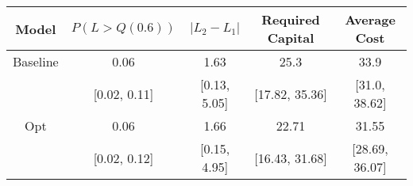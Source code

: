 \begin{tabular}{ccccc}
\toprule
   Model & $P(L > Q(0.6))$ & $|L_2 - L_1|$ & Required Capital &   Average Cost \\
\midrule
Baseline &            0.06 &          1.63 &             25.3 &           33.9 \\
         &    [0.02, 0.11] &  [0.13, 5.05] &   [17.82, 35.36] &  [31.0, 38.62] \\
     Opt &            0.06 &          1.66 &            22.71 &          31.55 \\
         &    [0.02, 0.12] &  [0.15, 4.95] &   [16.43, 31.68] & [28.69, 36.07] \\
\bottomrule
\end{tabular}
